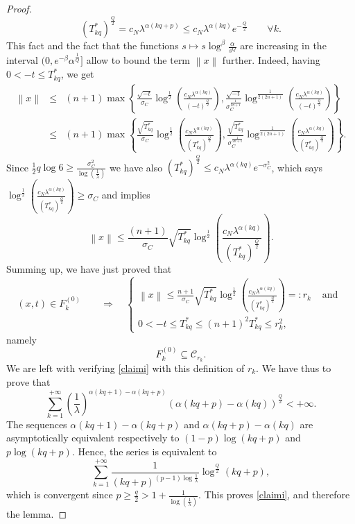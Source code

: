 \documentclass[10pt]{amsart}
\def \l {\lambda}
\def \Cyl {\mathcal{C}}
\def \Tst {T^*_{kq}}
\numberwithin{equation}{section}
\begin{document}
\begin{proof}
$$(\Tst)^{\frac{Q}{2}}=c_N\lambda^{\alpha(kq+p)}\leq c_N\lambda^{\alpha(kq)}e^{-\frac{Q}{2}}\qquad\forall k.$$
This fact and the fact that the functions $s\mapsto s\log^{\beta}\frac{\alpha}{s^Q}$ are increasing in the interval $(0,e^{-\beta}\alpha^{\frac{1}{Q}}]$ allow to bound the term $\left\|x\right\|$ further. Indeed, having $0<-t\leq\Tst$, we get
\begin{eqnarray*}
\left\|x\right\|&\leq&(n+1)\max{\left\{\frac{\sqrt{-t}}{\sigma_C}\log^{\frac{1}{2}}{\left(\frac{c_N\lambda^{\alpha(kq)}}{(-t)^{\frac{Q}{2}}}\right)}, \frac{\sqrt{-t}}{\sigma_C^{\frac{1}{2n+1}}}\log^{\frac{1}{2(2n+1)}}{\left(\frac{c_N\lambda^{\alpha(kq)}}{(-t)^{\frac{Q}{2}}}\right)}\right\}}\\
&\leq&(n+1)\max{\left\{\frac{\sqrt{\Tst}}{\sigma_C}\log^{\frac{1}{2}}{\left(\frac{c_N\lambda^{\alpha(kq)}}{(\Tst)^{\frac{Q}{2}}}\right)}, \frac{\sqrt{\Tst}}{\sigma_C^{\frac{1}{2n+1}}}\log^{\frac{1}{2(2n+1)}}{\left(\frac{c_N\lambda^{\alpha(kq)}}{(\Tst)^{\frac{Q}{2}}}\right)}\right\}}.
\end{eqnarray*}
Since $\frac{1}{2}q\log{6}\geq \frac{\sigma^2_C}{\log{(\frac{1}{\l})}}$ we have also $(\Tst)^{\frac{Q}{2}}\leq c_N\lambda^{\alpha(kq)}e^{-\sigma_C^2}$, which says $\log^{\frac{1}{2}}{\left(\frac{c_N\lambda^{\alpha(kq)}}{(\Tst)^{\frac{Q}{2}}}\right)}\geq \sigma_C$ and implies
$$\left\|x\right\|\leq\frac{(n+1)}{\sigma_C}\sqrt{\Tst}\log^{\frac{1}{2}}{\left(\frac{c_N\lambda^{\alpha(kq)}}{(\Tst)^{\frac{Q}{2}}}\right)}.$$
Summing up, we have just proved that
$$(x,t)\in F_k^{(0)}\qquad\Longrightarrow\quad\begin{cases}
\left\|x\right\|\leq\frac{n+1}{\sigma_C}\sqrt{\Tst}\log^{\frac{1}{2}}{\left(\frac{c_N\lambda^{\alpha(kq)}}{(\Tst)^{\frac{Q}{2}}}\right)}=:r_k & \text{ and }\\
0<-t\leq\Tst\leq (n+1)^2\Tst\leq r_k^2,&  \,
\end{cases}
$$
namely
$$F_k^{(0)}\subseteq \Cyl_{r_k}.$$
We are left with verifying \eqref{claimi} with this definition of $r_k$. We have thus to prove that
$$\sum_{k=1}^{+\infty}{\left(\frac{1}{\l}\right)^{\alpha(kq+1)-\alpha(kq+p)}\left(\alpha(kq+p)-\alpha(kq)\right)^{\frac{Q}{2}}}<+\infty.$$
The sequences $\alpha(kq+1)-\alpha(kq+p)$ and $\alpha(kq+p)-\alpha(kq)$ are asymptotically equivalent respectively to $(1-p)\log(kq+p)$ and $p\log(kq+p)$. Hence, the series is equivalent to
$$\sum_{k=1}^{+\infty}{\frac{1}{\left(kq+p\right)^{(p-1)\log\frac{1}{\l}}}\log^{\frac{Q}{2}}(kq+p)},$$
which is convergent since $p\geq\frac{q}{2}>1+\frac{1}{\log(\frac{1}{\l})}$. This proves \eqref{claimi}, and therefore the lemma.
\end{proof}
\end{document}
